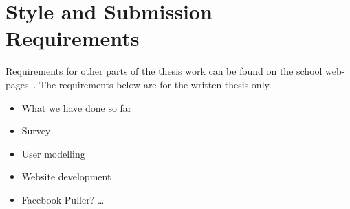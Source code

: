 \chapter{Style and Submission Requirements}\label{ch:style}

Requirements for other parts of the thesis work can be found on the school
web-pages~\cite{Noo05}.  The requirements below are for the written thesis
only.

\begin{itemize}
  \item What we have done so far
  \item Survey
  \item User modelling
  \item Website development
  \item Facebook Puller?
\ldots
\end{itemize}

